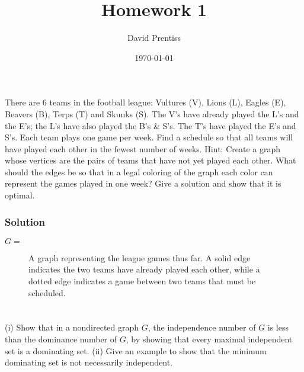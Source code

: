 \documentclass{amsart}
\author{David Prentiss}
\date{\today}
\title{Homework 1}
\begin{document}
\maketitle

\section{}
There are 6 teams in the football league: Vultures (V), Lions (L), Eagles (E),
Beavers (B), Terps (T) and Skunks (S).
The V's have already played the L's and the E's; the L's have also played the
B's \& S's.
The T's have played the E's and S's. Each team plays one game per week.
Find a schedule so that all teams will have played each other in the fewest
number of weeks.
Hint: Create a graph whose vertices are the pairs of teams that have not yet
played each other.
What should the edges be so that in a legal coloring of the graph each color can
represent the games played in one week?
Give a solution and show that it is optimal.

\subsubsection*{Solution}
$G = $
\begin{figure}[h]
  \caption{A graph representing the league games thus far. A solid edge
    indicates the two teams have already played each other, while a dotted edge
    indicates a game between two teams that must be scheduled.}
\end{figure}

\section{} %

(i) Show that in a nondirected graph $G$, the independence number of $G$ is less
than the dominance number of $G$, by showing that every maximal independent
set is a dominating set.
(ii) Give an example to show that the minimum dominating set is not necessarily
independent.
\end{document}
